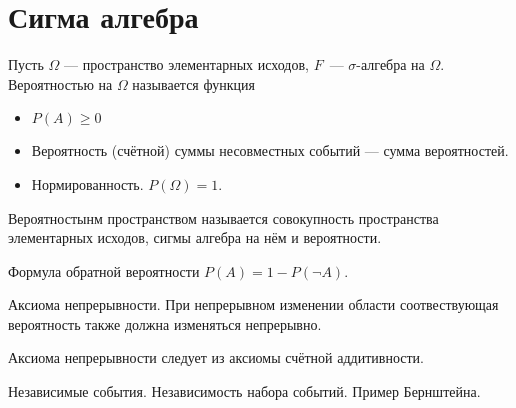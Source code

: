 \section{Сигма алгебра}

\begin{definition}
Пусть $\Omega$ --- пространство элементарных исходов, $F$~--- $\sigma$-алгебра на $\Omega$.
Вероятностью на $\Omega$ называется функция
\begin{itemize}
    \item $P(A) \geqslant 0$
    \item Вероятность (счётной) суммы несовместных событий --- сумма вероятностей.
    \item Нормированность. $P(\Omega) = 1$. 
\end{itemize}
\end{definition}

\begin{definition}
Вероятностынм пространством называется совокупность пространства элементарных исходов, сигмы алгебра на нём и вероятности.
\end{definition}

Формула обратной вероятности $P(A) = 1 - P(\neg A).$

Аксиома непрерывности. 
При непрерывном изменении области соотвествующая вероятность также должна изменяться непрерывно.

Аксиома непрерывности следует из аксиомы счётной аддитивности.

Независимые события. 
Независимость набора событий.
Пример Бернштейна.


\endinput